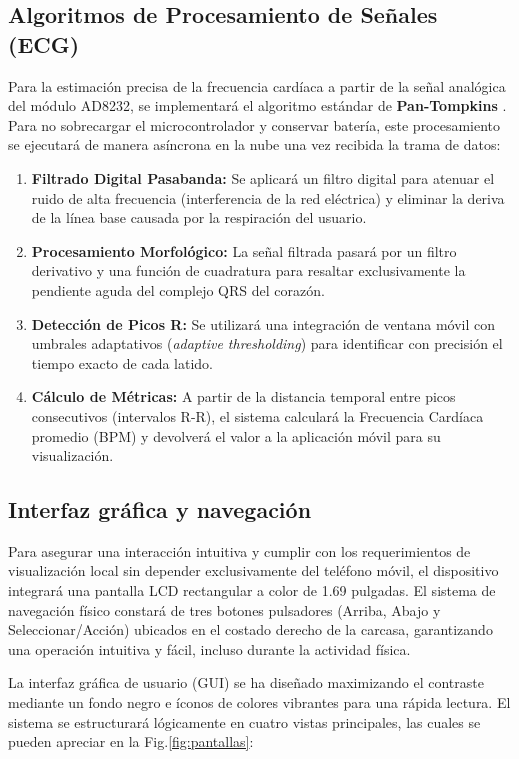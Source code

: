 \documentclass[letterpaper,11pt]{article}
\newcommand{\rfigura}[1]{Fig.\ref{#1}}
\begin{document}
\subsection{Algoritmos de Procesamiento de Señales (ECG)}
Para la estimación precisa de la frecuencia cardíaca a partir de la señal analógica del módulo AD8232, se implementará el algoritmo estándar de \textbf{Pan-Tompkins} \citep{pan_tompkins}. Para no sobrecargar el microcontrolador y conservar batería, este procesamiento se ejecutará de manera asíncrona en la nube una vez recibida la trama de datos:

\begin{enumerate}
    \item \textbf{Filtrado Digital Pasabanda:} Se aplicará un filtro digital para atenuar el ruido de alta frecuencia (interferencia de la red eléctrica) y eliminar la deriva de la línea base causada por la respiración del usuario.
    \item \textbf{Procesamiento Morfológico:} La señal filtrada pasará por un filtro derivativo y una función de cuadratura para resaltar exclusivamente la pendiente aguda del complejo QRS del corazón.
    \item \textbf{Detección de Picos R:} Se utilizará una integración de ventana móvil con umbrales adaptativos (\textit{adaptive thresholding}) para identificar con precisión el tiempo exacto de cada latido.
    \item \textbf{Cálculo de Métricas:} A partir de la distancia temporal entre picos consecutivos (intervalos R-R), el sistema calculará la Frecuencia Cardíaca promedio (BPM) y devolverá el valor a la aplicación móvil para su visualización.
\end{enumerate}


\subsection{Interfaz gráfica y navegación}
Para asegurar una interacción intuitiva y cumplir con los requerimientos de visualización local sin depender exclusivamente del teléfono móvil, el dispositivo integrará una pantalla LCD rectangular a color de 1.69 pulgadas. El sistema de navegación físico constará de tres botones pulsadores (Arriba, Abajo y Seleccionar/Acción) ubicados en el costado derecho de la carcasa, garantizando una operación intuitiva y fácil, incluso durante la actividad física.

La interfaz gráfica de usuario (GUI) se ha diseñado maximizando el contraste mediante un fondo negro e íconos de colores vibrantes para una rápida lectura. El sistema se estructurará lógicamente en cuatro vistas principales, las cuales se pueden apreciar en la \rfigura{fig:pantallas}:
\end{document}
